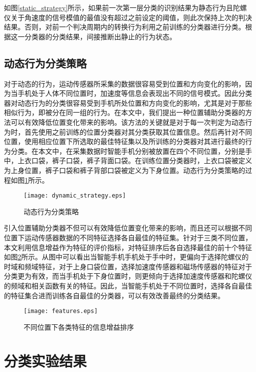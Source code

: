 \par 如图\ref{static_strategy}所示，如果前一次第一层分类的识别结果为静态行为且陀螺仪关于角速度的信号模值的最值没有超过之前设定的阈值，则此次保持上次的判决结果。否则，对前一个判决周期内的转换行为利用之前训练的分类器进行分类。根据这一分类器的分类结果，间接推断出静止的行为状态。

\subsection{动态行为分类策略}
\par 对于动态的行为，运动传感器所采集的数据很容易受到位置和方向变化的影响，因为当手机处于人体不同位置时，加速度等信息会表现出不同的信号模式\cite{lee2011activity}。因此分类器对动态行为的分类很容易受到手机所处位置和方向变化的影响，尤其是对于那些相似行为，即被分在同一组的行为。在本文中，我们提出一种位置辅助分类器的方法可以有效降低位置变化带来的影响。该方法的关键就是对于每一次判定为动态行为时，首先使用之前训练的位置分类器对其分类获取其位置信息。然后再针对不同位置，使用相应位置下所选取的最佳特征集以及所训练的分类器对其进行最终的行为分类。在本文中，在采集数据时智能手机分别被放置在四个不同位置，分别是手中，上衣口袋，裤子口袋，裤子背面口袋。在训练位置分类器时，上衣口袋被定义为上身位置，裤子口袋和裤子背部口袋被定义为下身位置。动态行为分类策略的过程如图\ref{dynamic_strategy}所示。
\begin{figure}[!htp]
 \centering
 \texttt{[image: dynamic\_strategy.eps]}
 \caption{动态行为分类策略}\label{dynamic_strategy}
\end{figure}
\par 引入位置辅助分类器不但可以有效降低位置变化带来的影响，而且还可以根据不同位置下运动传感器数据的不同特征选择各自最佳的特征集。针对于三类不同位置，本文利用信息增益作为特征的评价指标，对特征排序后各自选择最佳的前十个特征如图\ref{features}所示。从图中可以看出当智能手机手机处于手中时，更偏向于选择陀螺仪的时域和频域特征，对于上身口袋位置，选择加速度传感器和磁场传感器的特征对于分类更为有效，而当手机处于下身位置时，则更倾向于选择加速度传感器和陀螺仪的频域和相关函数有关的特征。因此，当智能手机处于不同位置时，选择各自最佳的特征集合进而训练各自最佳的分类器，可以有效改善最终的分类结果。
\begin{figure}[!htp]
 \centering
 \texttt{[image: features.eps]}
 \caption{不同位置下各类特征的信息增益排序}\label{features}
\end{figure}

\section{分类实验结果}
